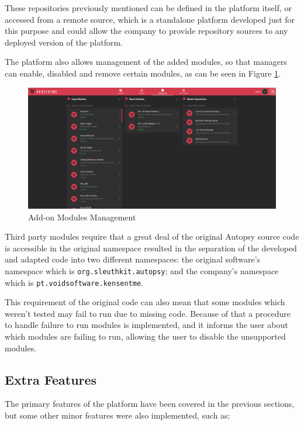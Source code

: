 These repositories previously mentioned can be defined in the platform itself, or accessed from a remote source, which is a standalone platform developed just for this purpose and could allow the company to provide repository sources to any deployed version of the platform.

The platform also allows management of the added modules, so that managers can enable, disabled and remove certain modules, as can be seen in Figure \ref{fig:modulesettings}.

\begin{figure}[ht]
 \centering
 \includegraphics[width=1\linewidth]{imgs/modulesettings.png}
 \caption{Add-on Modules Management}
 \label{fig:modulesettings}
\end{figure}

Third party modules require that a great deal of the original Autopsy source code is accessible in the original namespace resulted in the separation of the
developed and adapted code into two different namespaces: the original software's namespace which is \texttt{org.sleuthkit.autopsy}; and the company's namespace which is \texttt{pt.voidsoftware.kensentme}. 

This requirement of the original code can also mean that some modules which weren't tested may fail to run due to missing code. Because of that a procedure to handle failure to run modules is implemented, 
and it informs the user about which modules are failing to run, allowing the user to disable the unsupported modules.

\subsection{Extra Features}

The primary features of the platform have been covered in the previous sections, but some other minor features were also implemented, such as:


